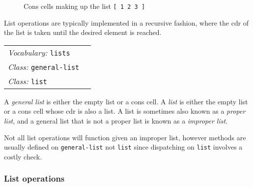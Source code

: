 \documentclass{book}
\newcommand{\vocabulary}[1]{\emph{Vocabulary:} \texttt{#1}&\\}
\newcommand{\classword}[1]{\index{\texttt{#1}}\emph{Class:} \texttt{#1}&\\}
\newcommand{\wordtable}[1]{

\begin{tabularx}{12cm}[t]{lX}
\hline
#1
\hline
\end{tabularx}

}
\begin{document}
\begin{figure}
\caption{Cons cells making up the list \texttt{[ 1 2 3 ]}}
\begin{center}
\end{center}
\end{figure}

List operations are typically implemented in a recursive fashion, where the cdr of the list is taken until the desired element is reached.

\wordtable{
\vocabulary{lists}
\classword{general-list}
\classword{list}
}
A \emph{general list} is either the empty list or a cons cell. A \emph{list} is either the empty list or a cons cell whose cdr is also a list. A list is sometimes also known as a \emph{proper list}, and a general list that is not a proper list is known as a \emph{improper list}.

Not all list operations will function given an improper list,
however methods are usually defined on \texttt{general-list} not \texttt{list} since dispatching on \texttt{list} involves a costly check.

\subsubsection{List operations}
\end{document}
